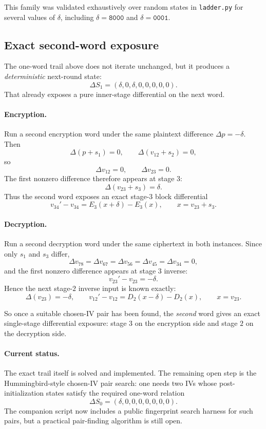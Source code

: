 \documentclass[11pt]{article}
\begin{document}
This family was validated exhaustively over random states in \texttt{ladder.py} for several values of $\delta$, including $\delta=\texttt{8000}$ and $\delta=\texttt{0001}$.

\subsection*{Exact second-word exposure}
The one-word trail above does not iterate unchanged, but it produces a \emph{deterministic} next-round state:
\[
\Delta S_1=(\delta,0,\delta,0,0,0,0,0).
\]
That already exposes a pure inner-stage differential on the next word.

\paragraph{Encryption.}
Run a second encryption word under the same plaintext difference $\Delta p=-\delta$. Then
\[
\Delta(p+s_1)=0,\qquad \Delta(v_{12}+s_2)=0,
\]
so
\[
\Delta v_{12}=0,\qquad \Delta v_{23}=0.
\]
The first nonzero difference therefore appears at stage $3$:
\[
\Delta(v_{23}+s_3)=\delta.
\]
Thus the second word exposes an exact stage-$3$ block differential
\[
v_{34}'-v_{34}=E_3(x+\delta)-E_3(x),
\qquad
x=v_{23}+s_3.
\]

\paragraph{Decryption.}
Run a second decryption word under the same ciphertext in both instances. Since only $s_1$ and $s_3$ differ,
\[
\Delta v_{78}=\Delta v_{67}=\Delta v_{56}=\Delta v_{45}=\Delta v_{34}=0,
\]
and the first nonzero difference appears at stage $3$ inverse:
\[
v_{23}'-v_{23}=-\delta.
\]
Hence the next stage-$2$ inverse input is known exactly:
\[
\Delta(v_{23})=-\delta,
\qquad
v_{12}'-v_{12}=D_2(x-\delta)-D_2(x),
\qquad
x=v_{23}.
\]

So once a suitable chosen-IV pair has been found, the \emph{second} word gives an exact single-stage differential exposure: stage $3$ on the encryption side and stage $2$ on the decryption side.

\paragraph{Current status.}
The exact trail itself is solved and implemented. The remaining open step is the Hummingbird-style chosen-IV pair search: one needs two IVs whose post-initialization states satisfy the required one-word relation
\[
\Delta S_0=(\delta,0,0,0,0,0,0,0).
\]
The companion script now includes a public fingerprint search harness for such pairs, but a practical pair-finding algorithm is still open.
\end{document}
